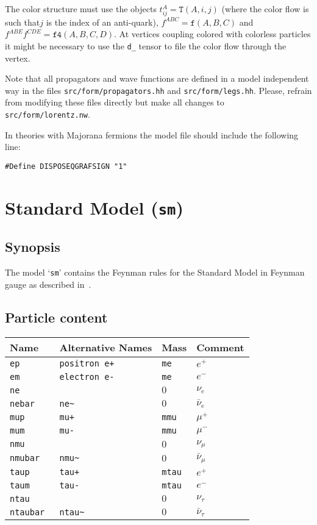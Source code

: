 \documentclass[11pt,a4paper]{refrep}
\begin{document}
The color structure must use the objects $t_{ij}^A=\mathtt{T}(A, i, j)$ (where the color flow is such
that$j$ is the index of an anti-quark), $f^{ABC}=\mathtt{f}(A, B, C)$ and
$f^{ABE}f^{CDE}=\mathtt{f4}(A,B,C,D)$. At vertices coupling colored with colorless particles
it might be necessary to use the \texttt{d\_} tensor to file the color flow through the vertex.

\attention Note that all propagators and wave functions are defined in a model independent
way in the files \texttt{src/form/propagators.hh} and \texttt{src/form/legs.hh}. Please,
refrain from modifying these files directly but make all changes to \texttt{src/form/lorentz.nw}.

In theories with Majorana fermions the model file should include the following
line:
\begin{lstlisting}[style=form]
#Define DISPOSEQGRAFSIGN "1"
\end{lstlisting}

\section{Standard Model (\texttt{sm})}
\label{sec:model-files:sm}
\subsection{Synopsis}
The model `\texttt{sm}' contains the Feynman rules for the
Standard Model in Feynman gauge as described
in~\cite[Appendix~A]{Boehm:2001}.

\subsection{Particle content}
\begin{tabular}{|l|l|l|p{2cm}|}
\hline
Name&Alternative Names&Mass&Comment\\
\hline
\tt ep & \tt positron e+ & \tt me& $e^+$\\
\tt em & \tt electron e- & \tt me& $e^-$\\
\tt ne & & $0$ & $\nu_e$\\
\tt nebar & \tt ne\~& $0$ & $\bar{\nu}_e$\\
\hline
\tt mup & \tt mu+ & \tt mmu& $\mu^+$\\
\tt mum & \tt mu- & \tt mmu& $\mu^-$\\
\tt nmu & & $0$ & $\nu_\mu$\\
\tt nmubar & \tt nmu\~ & $0$ & $\bar{\nu}_\mu$\\
\hline
\tt taup & \tt tau+ & \tt mtau& $e^+$\\
\tt taum & \tt tau- & \tt mtau& $e^-$\\
\tt ntau & & $0$ & $\nu_\tau$\\
\tt ntaubar & \tt ntau\~ & $0$ & $\bar{\nu}_\tau$\\
\hline
\end{tabular}
\end{document}
